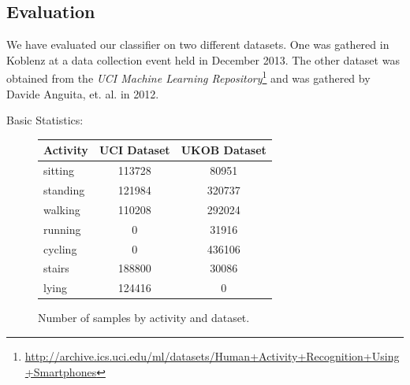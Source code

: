 

\subsection{Evaluation}\label{sec:har_eval}

We have evaluated our classifier on two different datasets.  One was
gathered in Koblenz at a data collection event held in December 2013.
The other dataset was obtained from the {\it UCI Machine Learning
  Repository}\footnote{\url{http://archive.ics.uci.edu/ml/datasets/Human+Activity+Recognition+Using+Smartphones}}
and was gathered by Davide Anguita, et. al. \cite{Anguita} in 2012.

Basic Statistics:
\begin{figure}
\centering
\begin{tabular}{|l|c|c|} \hline
Activity  & UCI Dataset & UKOB Dataset \\ \hline
sitting   & 113728      & 80951        \\
standing  & 121984      & 320737       \\
walking   & 110208      & 292024       \\
running   & 0           & 31916        \\
cycling   & 0           & 436106       \\
stairs    & 188800      & 30086        \\
lying     & 124416      & 0            \\ \hline
\end{tabular}
\caption{Number of samples by activity and dataset.}
\end{figure}



